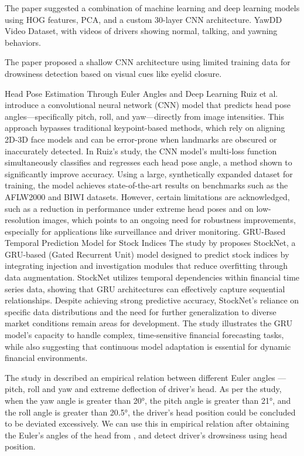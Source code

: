 The paper \cite{ramzan2024} suggested a combination of machine learning and deep learning models using HOG features, PCA, and a custom 30-layer CNN architecture. YawDD Video Dataset, with videos of drivers showing normal, talking, and yawning behaviors.

The paper \cite{venkatsewarulu_reddy} proposed a shallow CNN architecture using limited training data for drowsiness detection based on visual cues like eyelid closure.

Head Pose Estimation Through Euler Angles and Deep Learning Ruiz et al. \cite{ruiz2018} introduce a convolutional neural network (CNN) model that predicts head pose angles—specifically pitch, roll, and yaw—directly from image intensities. This approach bypasses traditional keypoint-based methods, which rely on aligning 2D-3D face models and can be error-prone when landmarks are obscured or inaccurately detected. In Ruiz’s study, the CNN model’s multi-loss function simultaneously classifies and regresses each head pose angle, a method shown to significantly improve accuracy. Using a large, synthetically expanded dataset for training, the model achieves state-of-the-art results on benchmarks such as the AFLW2000 and BIWI datasets.
However, certain limitations are acknowledged, such as a reduction in performance under extreme head poses and on low-resolution images, which points to an ongoing need for robustness improvements, especially for applications like surveillance and driver monitoring.
GRU-Based Temporal Prediction Model for Stock Indices The study by \cite{ruiz2018} proposes StockNet, a GRU-based (Gated Recurrent Unit) model designed to predict stock indices by integrating injection and investigation modules that reduce overfitting through data augmentation.
StockNet utilizes temporal dependencies within financial time series data, showing that GRU architectures can effectively capture sequential relationships. Despite achieving strong predictive accuracy, StockNet’s reliance on specific data distributions and the need for further generalization to diverse market conditions remain areas for development. The study illustrates the GRU model's capacity to handle complex, time-sensitive financial forecasting tasks, while also suggesting that continuous model adaptation is essential for dynamic financial environments.

The study in \cite{ye2023} described an empirical relation between different Euler angles --- pitch, roll and yaw and extreme deflection of driver's head. As per the study, when the yaw angle is greater than 20°, the pitch angle is greater than 21°, and the roll angle is greater than 20.5°, the driver’s head position could be concluded to be deviated excessively.
We can use this in empirical relation after obtaining the Euler's angles of the head from \cite{ruiz2018}, and detect driver's drowsiness using head position.

